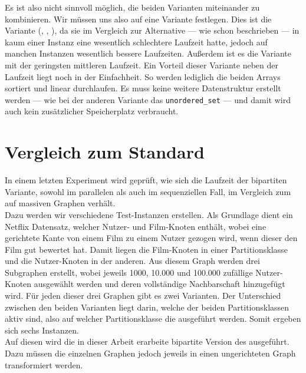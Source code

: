 Es ist also nicht sinnvoll möglich, die beiden Varianten miteinander zu kombinieren. Wir müssen uns
also auf eine Variante festlegen. Dies ist die Variante (\SorSor, \true, \distr), da sie im Vergleich zur
Alternative --- wie schon beschrieben ---
in kaum einer Instanz eine wesentlich schlechtere Laufzeit hatte, jedoch auf manchen Instanzen wesentlich
bessere Laufzeiten. Außerdem ist es die Variante mit der geringsten mittleren Laufzeit. 
Ein Vorteil dieser Variante neben der Laufzeit liegt noch in der Einfachheit. So werden
lediglich die beiden Arrays sortiert und linear durchlaufen. Es muss keine weitere Datenstruktur
erstellt werden --- wie bei der anderen Variante das \texttt{unordered\_set} --- und damit wird
auch kein zusätzlicher Speicherplatz verbraucht.




\section{Vergleich zum Standard \cb{}}
\label{kap:result}
In einem letzten Experiment wird geprüft, wie sich die Laufzeit der bipartiten \gc{}
Variante, sowohl im parallelen als auch im sequenziellen Fall,
 im Vergleich zum \cb{} auf massiven Graphen verhält.
\\

Dazu werden wir verschiedene Test-Instanzen erstellen.
Als Grundlage dient ein Netflix Datensatz\cite{kaggle}, welcher Nutzer- und Film-Knoten enthält, 
wobei eine gerichtete Kante von einem Film zu einem Nutzer gezogen wird, wenn dieser den 
Film gut bewertet hat. Damit liegen die Film-Knoten in einer Partitionsklasse und 
die Nutzer-Knoten in der anderen.
Aus diesem Graph werden drei Subgraphen erstellt, wobei jeweils 1000, 10.000 und 100.000  zufällige
Nutzer-Knoten ausgewählt werden und deren vollständige Nachbarschaft hinzugefügt wird.
Für jeden dieser drei Graphen gibt es zwei Varianten. Der Unterschied
zwischen den beiden Varianten liegt darin, welche der beiden Partitionsklassen aktiv sind, 
also auf welcher Partitionsklasse die  ausgeführt werden.
Somit ergeben sich sechs Instanzen. 
\\

Auf diesen wird 
die in dieser Arbeit erarbeite bipartite Version des \gc{} ausgeführt. Dazu müssen die
einzelnen Graphen jedoch jeweils in einen ungerichteten Graph transformiert werden.
\\

